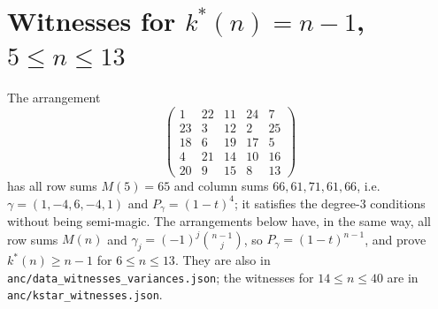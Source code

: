 \section{Witnesses for \texorpdfstring{$k^*(n)=n-1$, $5\le n\le13$}{k*(n)=n-1, 5<=n<=13}}
\label{sec:app_witnesses}

The arrangement
\[
\begin{pmatrix}1&22&11&24&7\\23&3&12&2&25\\18&6&19&17&5\\4&21&14&10&16\\20&9&15&8&13\end{pmatrix}
\]
has all row sums $M(5)=65$ and column sums $66,61,71,61,66$, i.e.\ $\gamma=(1,-4,6,-4,1)$ and $P_\gamma=(1-t)^4$; it satisfies the degree-$3$ conditions without being semi-magic.
The arrangements below have, in the same way, all row sums $M(n)$ and $\gamma_j=(-1)^j\binom{n-1}j$, so $P_\gamma=(1-t)^{n-1}$, and prove $k^*(n)\ge n-1$ for $6\le n\le13$.
They are also in \texttt{anc/data\_witnesses\_variances.json}; the witnesses for $14\le n\le40$ are in \texttt{anc/kstar\_witnesses.json}.

